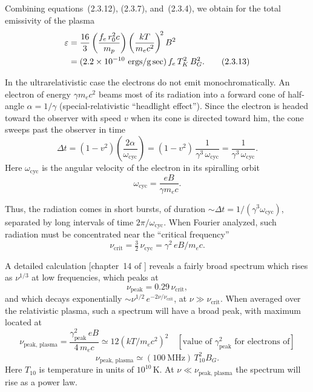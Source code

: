 Combining equations~(2.3.12), (2.3.7), and~(2.3.4), we obtain for the total
emissivity of the plasma
\begin{align}
\varepsilon &= \frac{16}{3}\left(\frac{f_e\,r_0^2 c}{m_p}\right)
\left(\frac{kT}{m_e c^2}\right)^{\!2} B^2 \notag \\
&= (2.2 \times 10^{-10}~\text{ergs/g\,sec})\,f_e\,T_K^2\,B_G^2.
\tag{2.3.13}
\end{align}

In the ultrarelativistic case the electrons do not emit monochromatically.
An electron of energy $\gamma m_e c^2$ beams most of its radiation into a forward cone of
half-angle $\alpha = 1/\gamma$ (special-relativistic ``headlight effect'').
Since the electron is
headed toward the observer with speed $v$ when its cone is directed toward him,
the cone sweeps past the observer in time
\begin{equation}
\Delta t = (1-v^2)\left(\frac{2\alpha}{\omega_{\text{cyc}}}\right) = (1-v^2)\,\frac{1}{\gamma^3\,\omega_{\text{cyc}}}
= \frac{1}{\gamma^3\,\omega_{\text{cyc}}}.
\tag{2.3.14}
\end{equation}
Here $\omega_{\text{cyc}}$ is the angular velocity of the electron in its spiralling orbit
\begin{equation}
\omega_{\text{cyc}} = \frac{eB}{\gamma m_e c}.
\tag{2.3.15}
\end{equation}

Thus, the radiation comes in short bursts, of duration $\sim\!\Delta t = 1/(\gamma^3\omega_{\text{cyc}})$,
separated by long intervals of time $2\pi/\omega_{\text{cyc}}$.
When Fourier analyzed, such
radiation must be concentrated near the ``critical frequency''
\begin{equation}
\nu_{\text{crit}} = \tfrac{3}{2}\,\nu_{\text{cyc}} = \gamma^2\,eB/m_e c.
\tag{2.3.16}
\end{equation}

A detailed calculation [chapter~14 of \citet{Jackson1962}] reveals a fairly broad
spectrum which rises as $\nu^{1/3}$ at low frequencies, which peaks at
\begin{equation}
\nu_{\text{peak}} = 0.29\,\nu_{\text{crit}},
\tag{2.3.17}
\end{equation}
and which decays exponentially $\sim\nu^{1/2}\,e^{-2\nu/\nu_{\text{crit}}}$, at $\nu \gg \nu_{\text{crit}}$.
When averaged over the relativistic plasma, such a spectrum will have a broad
peak, with maximum located at
\begin{equation}
\nu_{\text{peak, plasma}} = \frac{\gamma_{\text{peak}}^2\,eB}{4\,m_e c}
\simeq 12(kT/m_e c^2)^2
\quad\left[\text{value of $\gamma_{\text{peak}}^2$ for electrons of}\right]
\tag{2.3.18}
\end{equation}
\begin{equation}
\nu_{\text{peak, plasma}} \simeq (100~\text{MHz})\,T_{10}^2 B_G.
\tag*{}
\end{equation}
Here $T_{10}$ is temperature in units of $10^{10}$\,K.
At $\nu \ll \nu_{\text{peak, plasma}}$
the spectrum will rise as a power law.

